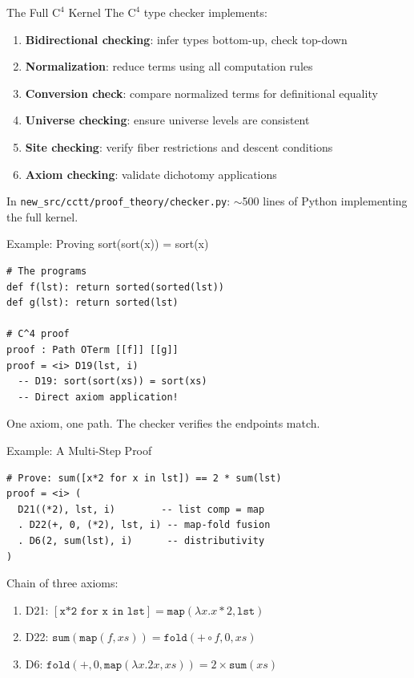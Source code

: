 \documentclass[aspectratio=169,11pt]{beamer}
\newcommand{\Cfour}{\mathrm{C}^4}
\begin{document}
\begin{frame}{The Full $\Cfour$ Kernel}
The $\Cfour$ type checker implements:

\begin{enumerate}
\item \textbf{Bidirectional checking}: infer types bottom-up, check top-down
\item \textbf{Normalization}: reduce terms using all computation rules
\item \textbf{Conversion check}: compare normalized terms for definitional equality
\item \textbf{Universe checking}: ensure universe levels are consistent
\item \textbf{Site checking}: verify fiber restrictions and descent conditions
\item \textbf{Axiom checking}: validate dichotomy applications
\end{enumerate}

\vspace{0.3em}
In \texttt{new\_src/cctt/proof\_theory/checker.py}: $\sim$500 lines of Python implementing the full kernel.
\end{frame}

\begin{frame}{Example: Proving sort(sort(x)) = sort(x)}
\begin{lstlisting}[language=deppy, basicstyle=\small\ttfamily]
# The programs
def f(lst): return sorted(sorted(lst))
def g(lst): return sorted(lst)

# C^4 proof
proof : Path OTerm [[f]] [[g]]
proof = <i> D19(lst, i)
  -- D19: sort(sort(xs)) = sort(xs)
  -- Direct axiom application!
\end{lstlisting}

\vspace{0.5em}
One axiom, one path. The checker verifies the endpoints match.
\end{frame}

\begin{frame}{Example: A Multi-Step Proof}
\begin{lstlisting}[language=deppy, basicstyle=\small\ttfamily]
# Prove: sum([x*2 for x in lst]) == 2 * sum(lst)
proof = <i> (
  D21((*2), lst, i)        -- list comp = map
  . D22(+, 0, (*2), lst, i) -- map-fold fusion
  . D6(2, sum(lst), i)      -- distributivity
)
\end{lstlisting}

\vspace{0.3em}
Chain of three axioms:
\begin{enumerate}
\item D21: $[\texttt{x*2 for x in lst}] = \texttt{map}(\lambda x.x*2, \texttt{lst})$
\item D22: $\texttt{sum}(\texttt{map}(f, xs)) = \texttt{fold}(+\circ f, 0, xs)$
\item D6: $\texttt{fold}(+, 0, \texttt{map}(\lambda x.2x, xs)) = 2 \times \texttt{sum}(xs)$
\end{enumerate}
\end{frame}
\end{document}
